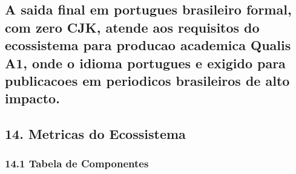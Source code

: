 \documentclass[
  12pt,
]{article}
\begin{document}
\subsection{A saida final em portugues brasileiro formal, com zero CJK,
atende aos requisitos do ecossistema para producao academica Qualis A1,
onde o idioma portugues e exigido para publicacoes em periodicos
brasileiros de alto
impacto.}\label{a-saida-final-em-portugues-brasileiro-formal-com-zero-cjk-atende-aos-requisitos-do-ecossistema-para-producao-academica-qualis-a1-onde-o-idioma-portugues-e-exigido-para-publicacoes-em-periodicos-brasileiros-de-alto-impacto.}

\subsection{14. Metricas do Ecossistema}\label{metricas-do-ecossistema}

\subsubsection{14.1 Tabela de Componentes}\label{tabela-de-componentes}
\end{document}
